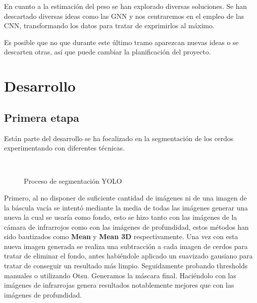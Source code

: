 \documentclass[12pt,a4paper]{article}
\begin{document}
En cuanto a la estimación del peso se han explorado diversas soluciones. Se han descartado diversas ideas como las GNN y nos centraremos en el empleo de las CNN, transformando los datos para tratar de exprimirlos al máximo.

Es posible que no que durante este último tramo aparezcan nuevas ideas o se descarten otras, así que puede cambiar la planificación del proyecto.







\section{Desarrollo}
\subsection{Primera etapa}

Están parte del desarrollo se ha focalizado en la segmentación de los cerdos experimentando con diferentes técnicas.

\begin{figure}[ht]%
 \centering
 \\
 \caption{Proceso de segmentación YOLO}%
 \label{yoloimg}%
\end{figure}


Primero, al no disponer de suficiente cantidad de imágenes ni de una imagen de la báscula vacía se intentó mediante la media de todas las imágenes generar una nueva la cual se usaría como fondo, esto se hizo tanto con las imágenes de la cámara de infrarrojos como con las imágenes de profundidad, estos métodos han sido bautizados como \textbf{Mean} y \textbf{Mean 3D} respectivamente. Una vez con esta nueva imagen generada se realiza una subtracción a cada imagen de cerdos para tratar de eliminar el fondo, antes habiéndole aplicado un suavizado gausiano para tratar de conseguir un resultado más limpio. Seguidamente probando thresholds manuales o utilizando Otsu\cite{Otsu}. Generamos la máscara final. Haciéndolo con las imágenes de infrarrojas genera resultados notablemente mejores que con las imágenes de profundidad.
\end{document}
